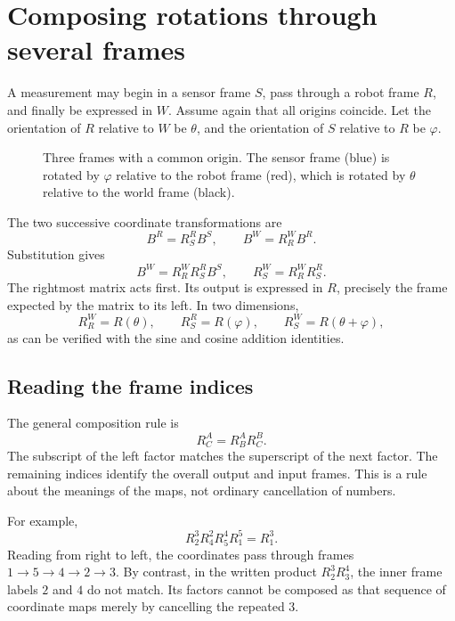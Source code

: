 \section{Composing rotations through several frames}
A measurement may begin in a sensor frame $S$, pass through a robot frame $R$,
and finally be expressed in $W$. Assume again that all origins coincide.
Let the orientation of $R$ relative to $W$ be $\theta$, and the orientation
of $S$ relative to $R$ be $\varphi$.

\begin{figure}[htbp]
\centering
\caption{Three frames with a common origin. The sensor frame (blue) is rotated
by $\varphi$ relative to the robot frame (red), which is rotated by $\theta$
relative to the world frame (black).}
\label{fig:l02-composition}
\end{figure}

The two successive coordinate transformations are
\[
 B^R=R_S^R B^S,\qquad B^W=R_R^W B^R.
\]
Substitution gives
\begin{equation}
 B^W=R_R^W R_S^R B^S,\qquad
 \boxed{R_S^W=R_R^W R_S^R.}
 \label{eq:l02-chain}
\end{equation}
The rightmost matrix acts first. Its output is expressed in $R$, precisely the
frame expected by the matrix to its left. In two dimensions,
\[
 R_R^W=R(\theta),\qquad R_S^R=R(\varphi),\qquad
 R_S^W=R(\theta+\varphi),
\]
as can be verified with the sine and cosine addition identities.

\subsection{Reading the frame indices}
The general composition rule is
\begin{equation}
 R_C^A=R_B^A R_C^B.
\end{equation}
The subscript of the left factor matches the superscript of the next factor.
The remaining indices identify the overall output and input frames. This is
a rule about the meanings of the maps, not ordinary cancellation of numbers.

For example,
\begin{equation}
 R_2^3 R_4^2 R_5^4 R_1^5=R_1^3.
 \label{eq:l02-long-chain}
\end{equation}
Reading from right to left, the coordinates pass through frames
$1\to5\to4\to2\to3$. By contrast, in the written product $R_2^3 R_3^4$,
the inner frame labels $2$ and $4$ do not match. Its factors cannot be composed
as that sequence of coordinate maps merely by cancelling the repeated $3$.

